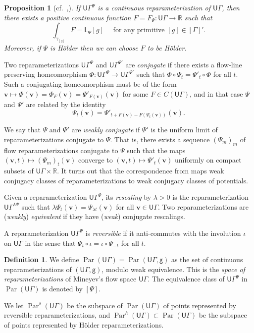 \documentclass[twoside]{amsart}
\newtheorem{proposition}[theorem]{Proposition}
\theoremstyle{definition}
\newtheorem{definition}[theorem]{Definition}
\numberwithin{equation}{section}
\numberwithin{theorem}{section}
\newcommand{\msf}[1]{\mathsf{#1}}
\newcommand{\R}{\mathbb{R}}
\newcommand{\G}{\Gamma}
\newcommand{\gam}{\gamma}
\newcommand{\lam}{\lambda}
\DeclareMathOperator{\Par}{Par}
\newcommand{\ra}{\rightarrow}
\newcommand{\vv}{\mathbf{v}}
\newcommand{\UG}{\msf{U}\G}
\newcommand{\vg}{\msf{g}}
\newcommand{\sfP}{\mathsf{\Psi}}
\begin{document}
\begin{proposition}[cf.~{\cite[Proposition~1.11]{tholozan},\cite[Corollary~2.2.3]{sambarino.report}}]\label{prop:par->C}
If $\UG^\sfP$ is a continuous reparameterization of $\UG$, then there exists a positive continuous function $F=F_\sfP:\UG \ra \R$ such that
\begin{equation*}
\int_{\gam_{[g]}}{F}=\msf{L}_{\sfP}[g] \quad \text{ for any primitive }[g]\in [\G]'.
\end{equation*}
Moreover, if $\sfP$ is H\"older then we can choose $F$ to be H\"older.
\end{proposition}

Two reparameterizations $\UG^\sfP$ and $\UG^{\sfP'}$ are \emph{conjugate} if there exists a flow-line preserving homeomorphism $\Phi:\UG^\sfP\ra \UG^{\sfP'}$ such that $\Phi \circ \sfP_t=\sfP'_t \circ \Phi$ for all $t$. Such a conjugating homeomorphism must be of the form $\vv \mapsto \Phi(\vv)=\Phi_F(\vv)=\sfP'_{F(\vv)}(\vv)$ for some $F \in C(\UG)$, and in that case $\sfP$ and $\sfP'$ are related by the identity 
\begin{equation*}
\sfP_t(\vv)=\sfP'_{t+F(\vv)-F(\sfP_t(\vv))}(\vv).
\end{equation*}

We say that $\sfP$ and $\sfP'$ are \emph{weakly conjugate} if $\sfP'$ is the uniform limit of reparameterizations conjugate to $\sfP$. That is, there exists a sequence $(\sfP_m)_m$ of flow reparameterizations conjugate to $\sfP$ such that the maps $(\vv,t)\mapsto (\sfP_m)_t(\vv)$ converge to $(\vv,t)\mapsto \sfP'_t(\vv)$ uniformly on compact subsets of $\UG \times \R$. It turns out that the correspondence from  maps weak conjugacy classes of reparameterizations to weak conjugacy classes of potentials.  

Given a reparameterization $\UG^\sfP$, its \emph{rescaling} by $\lam>0$ is the reparameterization $\UG^{\lam\sfP}$ such that $\lam\sfP_{t}(\vv)=\sfP_{\lam t}(\vv)$ for all $\vv\in \UG$. Two reparameterizations are (\emph{weakly}) \emph{equivalent} if they have (\emph{weak}) conjugate rescalings. 

A reparameterization $\UG^{\sfP}$ is \emph{reversible} if it anti-commutes with the involution $\iota$ on $\UG$ in the sense that $\sfP_t\circ \iota=\iota \circ \sfP_{-t}$ for all $t$. 

\begin{definition}\label{def:PAR}
    We define $\Par(\UG)=\Par(\UG,\msf{g})$ as the set of continuous reparameterizations of $(\UG,\vg)$, modulo weak equivalence. This is the \emph{space of reparameterizations} of Mineyev's flow space $\UG$. The equivalence class of $\UG^\sfP$ in $\Par(\UG)$ is denoted by $[\sfP]$.
    
    We let $\Par^s(\UG)$ be the subspace of $\Par(\UG)$ of points represented by reversible reparameterizations, and $\Par^h(\UG)\subset \Par(\UG)$ be the subspace of points represented by H\"older reparameterizations.
\end{definition}
\end{document}
